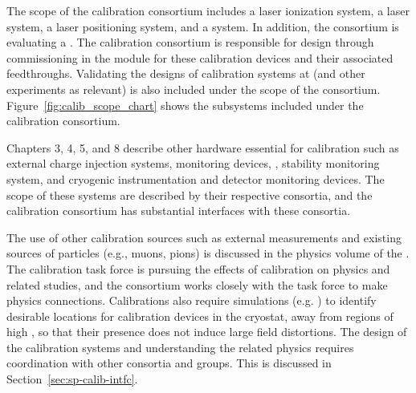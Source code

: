 
The scope of the calibration consortium includes a laser ionization system, a \phel laser system, a laser positioning system, and a 
system. In addition, the consortium is evaluating a .
 The calibration consortium is responsible for design through commissioning in the  module for these calibration devices and their associated feedthroughs. Validating the designs of calibration systems at  (and other experiments as relevant) is also included under the scope of the consortium. Figure~\ref{fig:calib_scope_chart} shows the subsystems included under the calibration consortium. 

Chapters 3, 4, 5, and 8  describe other hardware essential for calibration such as  external charge injection systems,  monitoring devices, ,
stability monitoring system, and cryogenic instrumentation and detector monitoring devices. The scope of these systems are described by their respective consortia, and the calibration consortium has substantial interfaces with these consortia. 

The use of other calibration sources such as external measurements and existing sources of particles (e.g., muons, pions) is discussed in the physics volume of the . The calibration task force is pursuing the effects of calibration on physics and related studies, and the consortium works closely with the task force to make physics connections. Calibrations also require simulations (e.g. \efield) to identify desirable locations for calibration devices in the cryostat, away from regions of high \efield, so that their presence does not induce large field distortions. 
The design of the calibration systems and understanding the related physics requires coordination with other consortia and groups. This is discussed in Section~\ref{sec:sp-calib-intfc}.


